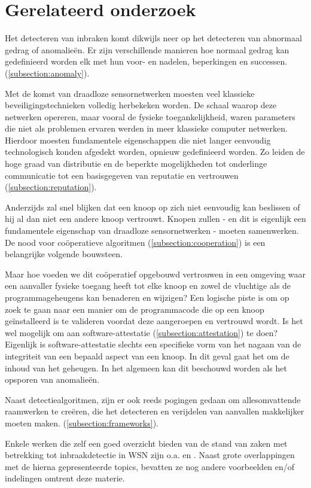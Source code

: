 \section{Gerelateerd onderzoek}
\label{section:related}

Het detecteren van inbraken komt dikwijls neer op het detecteren van abnormaal
gedrag of anomalie\"en. Er zijn verschillende manieren hoe normaal gedrag kan
gedefinieerd worden elk met hun voor- en nadelen, beperkingen en successen.
(\ref{subsection:anomaly}).

Met de komst van draadloze sensornetwerken moesten veel klassieke
beveiligingstechnieken volledig herbekeken worden. De schaal waarop deze
netwerken opereren, maar vooral de fysieke toegankelijkheid, waren parameters
die niet als problemen ervaren werden in meer klassieke computer netwerken.
Hierdoor moesten fundamentele eigenschappen die niet langer eenvoudig
technologisch konden afgedekt worden, opnieuw gedefinieerd worden. Zo leiden de
hoge graad van distributie en de beperkte mogelijkheden tot onderlinge
communicatie tot een basisgegeven van reputatie en vertrouwen
(\ref{subsection:reputation}).

Anderzijds zal snel blijken dat een knoop op zich niet eenvoudig kan beslissen
of hij al dan niet een andere knoop vertrouwt. Knopen zullen - en dit is
eigenlijk een fundamentele eigenschap van draadloze sensornetwerken - moeten
samenwerken. De nood voor co\"operatieve algoritmen
(\ref{subsection:cooperation}) is een belangrijke volgende bouwsteen.

Maar hoe voeden we dit co\"operatief opgebouwd vertrouwen in een omgeving waar
een aanvaller fysieke toegang heeft tot elke knoop en zowel de vluchtige als de
programmageheugens kan benaderen en wijzigen? Een logische piste is om op zoek
te gaan naar een manier om de programmacode die op een knoop ge\"installeerd is
te valideren voordat deze aangeroepen en vertrouwd wordt. Is het wel mogelijk
om aan software-attestatie (\ref{subsection:attestation}) te doen? Eigenlijk is
software-attestatie slechts een specifieke vorm van het nagaan van de
integriteit van een bepaald aspect van een knoop. In dit geval gaat het om de
inhoud van het geheugen. In het algemeen kan dit beschouwd worden als het
opsporen van anomalie\"en.

Naast detectiealgoritmen, zijn er ook reeds pogingen gedaan om allesomvattende
raamwerken te cre\"eren, die het detecteren en verijdelen van aanvallen
makkelijker moeten maken. (\ref{subsection:frameworks}).

Enkele werken die zelf een goed overzicht bieden van de stand van zaken met
betrekking tot inbraakdetectie in WSN zijn o.a. \citep{mishra2004intrusion} en
\citep{alrajeh2013intrusion}. Naast grote overlappingen met de hierna
gepresenteerde topics, bevatten ze nog andere voorbeelden en/of indelingen
omtrent deze materie.






